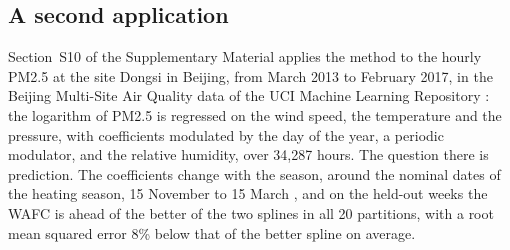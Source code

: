 \documentclass[12pt]{article} %
\theoremstyle{definition}
\theoremstyle{plain}
\begin{document}
{

\subsection{A second application}
\label{sec:app-beijing}

Section~S10 of the Supplementary Material applies the method to the hourly
PM2.5 at the site Dongsi in Beijing, from March 2013 to February 2017, in the
Beijing Multi-Site Air Quality data of the UCI Machine Learning Repository
\citep{Chen-UCI-2017, Zhang-Guo-Dong-He-Xu-Chen-2017}:
the logarithm of PM2.5 is regressed on the wind speed, the temperature and
the pressure, with coefficients modulated by the day of the year, a periodic
modulator, and the relative humidity, over 34,287 hours. The question there
is prediction. The coefficients change with the season, around the nominal
dates of the heating season, 15 November to 15 March
\citep[Section~7]{Liang-Zou-Guo-Li-Zhang-Zhang-Huang-Chen-2015}, and on the
held-out weeks the WAFC is ahead of the better of the two splines in all 20
partitions, with a root mean squared error 8\% below that of the better
spline on average.
}
\end{document}
